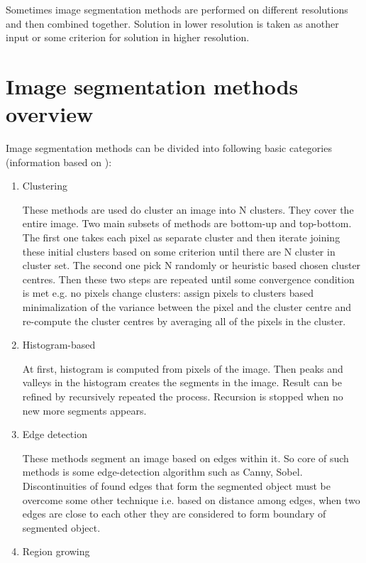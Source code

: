 Sometimes image segmentation methods are performed on different resolutions and then combined together.
Solution in lower resolution is taken as another input or some criterion for solution in higher resolution.

\section{Image segmentation methods overview}

Image segmentation methods can be divided into following basic categories (information based on \cite{wiki}):

\begin{enumerate}

  \item Clustering

  These methods are used do cluster an image into N clusters.
They cover the entire image.
Two main subsets of methods are bottom-up and top-bottom.
The first one takes each pixel as separate cluster and then iterate joining these initial clusters based on some criterion until there are N cluster in cluster set.
The second one pick N randomly or heuristic based chosen cluster centres.
Then these two steps are repeated until some convergence condition is met e.g. no pixels change clusters: assign pixels to clusters based minimalization of the variance between the pixel and the cluster centre and re-compute the cluster centres by averaging all of the pixels in the cluster.

  \item Histogram-based

  At first, histogram is computed from pixels of the image.
Then peaks and valleys in the histogram creates the segments in the image.
Result can be refined by recursively repeated the process.
Recursion is stopped when no new more segments appears.

  \item Edge detection

  These methods segment an image based on edges within it.
So core of such methods is some edge-detection algorithm such as Canny, Sobel.
Discontinuities of found edges that form the segmented object must be overcome some other technique i.e. based on distance among edges, when two edges are close to each other they are considered to form boundary of segmented object.

  \item Region growing


\end{enumerate}
